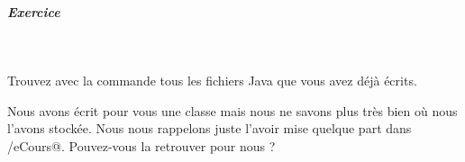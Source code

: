 \documentclass[11pt,a4paper]{article}
\begin{document}
			
		\subparagraph{Exercice} 
		
					\textcolor{white}{.} \par
				
            \par
        
				Trouvez avec la commande 
				\verb@find@
				tous les fichiers Java que vous avez d\'ej\`a \'ecrits.
			
            \par
        
			\par\medskip
				Nous avons \'ecrit pour vous une classe
				\verb@Color@
				mais nous ne savons plus tr\`es bien
				o\`u nous l'avons stock\'ee.
				Nous nous rappelons juste l'avoir mise
				quelque part dans 
				\verb@/eCours@.
				Pouvez-vous la retrouver pour nous ?
			
            \par
        
\end{document}

